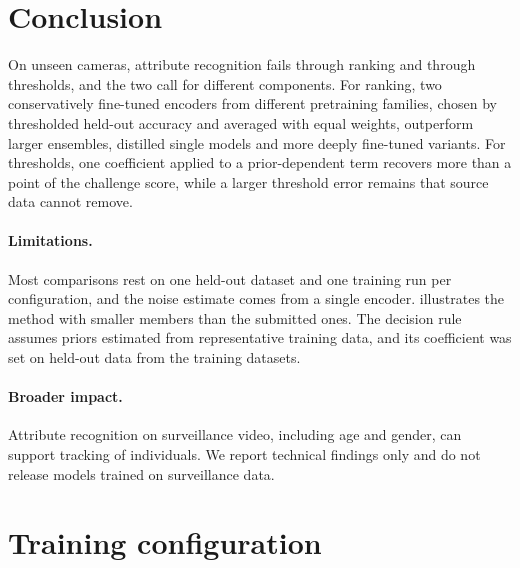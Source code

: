 \documentclass[10pt,twocolumn,letterpaper]{article}
\begin{document}
\section{Conclusion}
\label{sec:conclusion}

On unseen cameras, attribute recognition fails through ranking and through thresholds, and the two call for different components. For ranking, two conservatively fine-tuned encoders from different pretraining families, chosen by thresholded held-out accuracy and averaged with equal weights, outperform larger ensembles, distilled single models and more deeply fine-tuned variants. For thresholds, one coefficient applied to a prior-dependent term recovers more than a point of the challenge score, while a larger threshold error remains that source data cannot remove.

\paragraph{Limitations.} Most comparisons rest on one held-out dataset and one training run per configuration, and the noise estimate comes from a single encoder.  illustrates the method with smaller members than the submitted ones. The decision rule assumes priors estimated from representative training data, and its coefficient was set on held-out data from the training datasets.

\paragraph{Broader impact.} Attribute recognition on surveillance video, including age and gender, can support tracking of individuals. We report technical findings only and do not release models trained on surveillance data.

{\small


}

\clearpage
\appendix
\section{Training configuration}
\label{app:config}
\end{document}
